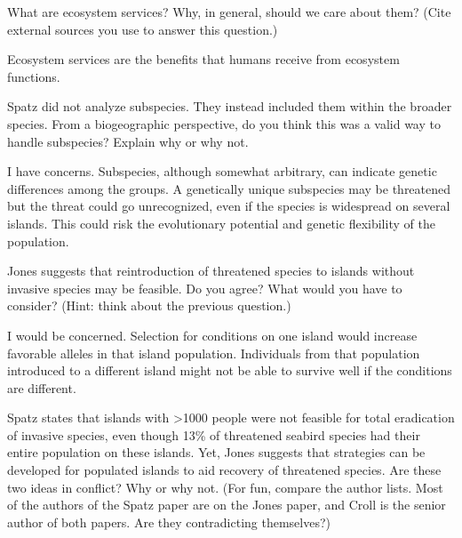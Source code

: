 \documentclass[11pt, addpoints]{exam}
\begin{document}
\begin{questions}
\question[5]
What are ecosystem services? Why, in general, should we care about them? (Cite external sources you use to answer this question.)

\begin{solution}
	Ecosystem services are the benefits that humans receive from ecosystem functions.
\end{solution}

\question[5]
Spatz did not analyze subspecies. They instead included them within the broader species. From a biogeographic perspective, do you think this was a valid way to handle subspecies? Explain why or why not.

\begin{solution}
	I have concerns. Subspecies, although somewhat arbitrary, can indicate genetic differences among the groups. A genetically unique subspecies may be threatened but the threat could go unrecognized, even if the species is widespread on several islands. This could risk the evolutionary potential and genetic flexibility of the population.
\end{solution}

\question[5] \label{ques:subspecies}
Jones suggests that reintroduction of threatened species to islands without invasive species may be feasible. Do you agree?  What would you have to consider? (Hint: think about the previous question.)

\begin{solution}
	I would be concerned. Selection for conditions on one island would increase favorable alleles in that island population. Individuals from that population introduced to a different island might not be able to survive well if the conditions are different.
\end{solution}


\question[5]
Spatz states that islands with \textgreater1000 people were not feasible for total eradication of invasive species, even though 13\% of threatened seabird species had their entire population on these islands. Yet, Jones suggests that strategies can be developed for populated islands to aid recovery of threatened species. Are these two ideas in conflict?  Why or why not. (For fun, compare the author lists. Most of the authors of the Spatz paper are on the Jones paper, and Croll is the senior author of both papers. Are they contradicting themselves?)



\end{questions}
\end{document}
